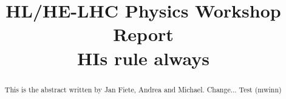 \documentclass[11pt,twoside,a4paper]{cernrep}
\def\bibfiles{\main/bib/chapter,\main/section1/bib/section,\main/section2/bib/section}
\providecommand{\biblio}{\nocite{article-minimal}\clearpage}  %
\begin{document}
\newcommand{\main}{.}
\def\biblio{}

\title{HL/HE-LHC Physics Workshop Report \\[5mm]
  HIs rule always}


\maketitle

\begin{abstract}
  This is the abstract written by Jan Fiete, Andrea and Michael. Change...
  Test (mwinn)
\end{abstract}

\setcounter{tocdepth}{2}
\tableofcontents
\newpage


\newpage

\newpage




\end{document}
